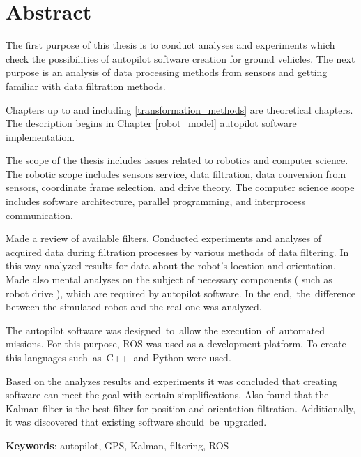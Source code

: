 \section*{Abstract}
{
    The first purpose of this thesis is to conduct analyses and experiments which check the possibilities of autopilot software creation for ground vehicles. The next purpose is an analysis of data processing methods from sensors and getting familiar with data filtration methods.

    Chapters up to and including \ref{transformation_methods} are theoretical chapters. The description begins in Chapter \ref{robot_model} autopilot software implementation.
    
    The scope of the thesis includes issues related to robotics and computer science. The robotic scope includes sensors service, data filtration, data conversion from sensors, coordinate frame selection, and drive theory. The computer science scope includes software architecture, parallel programming, and interprocess communication.

    Made a review of available filters. Conducted experiments and analyses of acquired data during filtration processes by various methods of data filtering. In this way analyzed results for data about the robot's location and orientation. Made also mental analyses on the subject of necessary components ( such as robot drive ), which are required by autopilot software. In the end,~the~difference between the simulated robot and the real one was analyzed.

    The autopilot software was designed~to~allow the execution~of~automated
    missions. For this purpose, ROS was used as a development platform. To create this
    languages such~as~C++~and Python were used.

     Based on the analyzes results and experiments it was concluded that creating software can meet the goal with certain simplifications. Also found that the Kalman filter is the best filter for position and orientation filtration. Additionally, it was discovered that existing software should~be~upgraded.
    
    \textbf{Keywords}: autopilot, GPS, Kalman, filtering, ROS
}